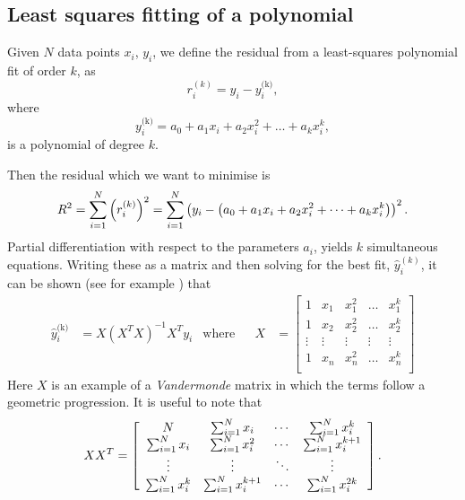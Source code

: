 \documentclass[../full_thesis/full_thesis.tex]{subfiles}
\begin{document}
\begin{subappendices}
\subsection{Least squares fitting of a polynomial}
Given $N$ data points $x_{i}$, $y_{i}$, we define the residual from a least-squares
polynomial fit of order $k$, as
\begin{equation}
    r_i^{(k)} = y_{i} - y^{\textrm{(k)}}_{i},
\end{equation}
where
\begin{equation}
y^{\textrm{(k)}}_{i} = a_{0} + a_{1}x_{i} + a_{2}x_{i}^{2} + \dots
                                                           + a_{k} x_{i}^{k},
\end{equation}
is a polynomial of degree $k$.

Then the residual which we want to minimise is
\begin{equation}
R^{2} = \sum_{i=1}^{N}\left(r_i^{(k)}\right)^{2}
      = \sum_{i=1}^{N}\left(y_{i} - \left(a_{0} + a_{1}x_{i} + a_{2}x_{i}^{2} +
        \dots + a_{k} x_{i}^{k}\right)\right)^{2}.
\end{equation}
Partial differentiation with respect to the parameters $a_{i}$, yields $k$
simultaneous equations. Writing these as a matrix and then solving
for the best fit, $\hat{y}^(k)_i$, it can be shown (see for example
\citet{WolframLeastSquares}) that
\begin{align}
\hat{y}^{\textrm{(k)}}_{i} & = X \left(X^{T}X\right)^{-1} X^{T} y_{i} & \textrm{where} & &
X & = \left[\begin{array}{ccccc}
1 & x_{1} & x_{1}^{2} & \dots & x_{1}^{k} \\
1 & x_{2} & x_{2}^{2} & \dots & x_{2}^{k} \\
\vdots & \vdots & \vdots & \vdots & \vdots \\
1 & x_{n} & x_{n}^{2} & \dots & x_{n}^{k} \\
\end{array}\right]
\end{align}
Here $X$ is an example of a \emph{Vandermonde} matrix in which the terms follow
a geometric progression. It is useful to note that
\begin{equation}
XX^{T} = \left[\begin{array}{cccc}
N & \sum_{i=1}^{N}x_{i} & \cdots &  \sum_{i=1}^{N}x_{i}^{k} \\
\sum_{i=1}^{N}x_{i} & \sum_{i=1}^{N}x_{i}^{2} & \cdots &  \sum_{i=1}^{N}x_{i}^{k+1} \\
\vdots & \vdots & \ddots & \vdots \\
\sum_{i=1}^{N}x_{i}^{k} & \sum_{i=1}^{N}x_{i}^{k+1} & \cdots &  \sum_{i=1}^{N}x_{i}^{2k}
\end{array}\right].
\end{equation}


\end{subappendices}
\end{document}
